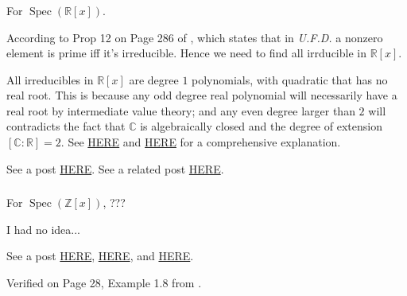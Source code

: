 \subsubsection{}
For $\operatorname{Spec}(\mathbb R[x])$. 

According to Prop 12 on Page 286 of \cite{dummit2004abstract}, which states that in \textit{U.F.D.} a nonzero element is prime iff it's irreducible. 
Hence we need to find all irrducible in $\mathbb R[x]$.

All irreducibles in $\mathbb R[x]$ are degree $1$ polynomials, with quadratic that has no real root. This is because any odd degree real polynomial will necessarily have a real root by intermediate value theory; and any even degree larger than $2$ will contradicts the fact that $\mathbb C$ is algebraically closed and the degree of extension $[\mathbb C:\mathbb R]=2$. See \href{https://math.stackexchange.com/questions/2127249/what-are-the-irreducible-elements-in-mathbbrx-and-mathbbcx}{HERE} and \href{https://math.stackexchange.com/questions/4088566/most-even-degree-polynomials-in-mathbbrx-are-reducible}{HERE} for a comprehensive explanation. 

See a post \href{https://math.stackexchange.com/questions/1057642/describe-the-topology-of-spec-mathbbrx}{HERE}.
See a related post \href{https://math.stackexchange.com/questions/4452569/describe-operatornamespec-mathbbrx-xn}{HERE}. 



\subsubsection{}

For $\operatorname{Spec}(\mathbb Z[x])$, ???

I had no idea... 

See a post \href{https://math.stackexchange.com/questions/4088566/most-even-degree-polynomials-in-mathbbrx-are-reducible}{HERE}, \href{https://math.stackexchange.com/questions/1089479/a-question-on-mumfords-drawing-of-textspec-mathbbzx}{HERE}, and \href{URLhttps://math.stackexchange.com/questions/174595/classification-of-prime-ideals-of-mathbbzx}{HERE}. 

Verified on Page 28, Example 1.8 from \cite{QingLiu2002algebraic}. 

\subsubsection{}

